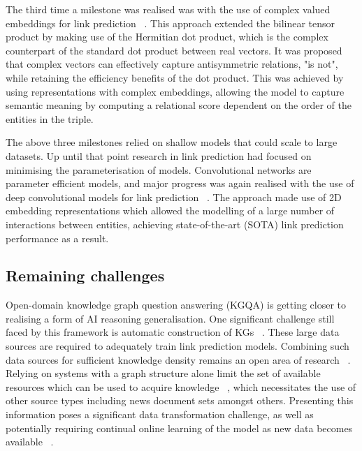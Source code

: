 \noindent The third time a milestone was realised was with the use of complex valued embeddings for link prediction \unskip~\citep{trouillon2016complex}. This approach extended the bilinear tensor product by making use of the Hermitian dot product, which is the complex counterpart of the standard dot product between real vectors. It was proposed that complex vectors can effectively capture antisymmetric relations, "is not", while retaining the efficiency benefits of the dot product. This was achieved by using representations with complex embeddings, allowing the model to capture semantic meaning by computing a relational score dependent on the order of the entities in the triple. \par
 
\noindent The above three milestones relied on shallow models that could scale to large datasets. Up until that point research in link prediction had focused on minimising the parameterisation of models. Convolutional networks are parameter efficient models, and major progress was again realised with the use of deep convolutional models for link prediction \unskip~\citep{dettmers2018convolutional}. The approach made use of 2D embedding representations which allowed the modelling of a large number of interactions between entities, achieving state-of-the-art (SOTA) link prediction performance as a result. \par

\subsection{Remaining challenges}

\noindent Open-domain knowledge graph question answering (KGQA) is getting closer to realising a form of AI reasoning generalisation. One significant challenge still faced by this framework is automatic construction of KGs \unskip~\citep{dong2014knowledge}. These large data sources are required to adequately train link prediction models. Combining such data sources for sufficient knowledge density remains an open area of research \unskip~\citep{diefenbach2018wdaqua}. Relying on systems with a graph structure alone limit the set of available resources which can be used to acquire knowledge \unskip~\citep{chen2017reading}, which necessitates the use of other source types including news document sets amongst others. Presenting this information poses a significant data transformation challenge, as well as potentially requiring continual online learning of the model as new data becomes available \unskip~\citep{abujabal2018never}. \par

